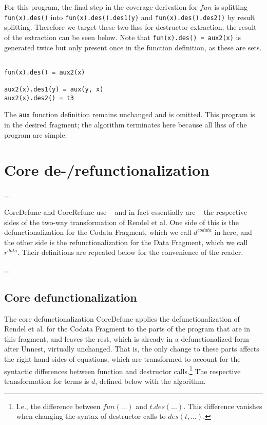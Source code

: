 For this program, the final step in the coverage derivation for $fun$ is splitting \texttt{fun(x).des()} into \texttt{fun(x).des().des1(y)} and \texttt{fun(x).des().des2()} by result splitting. Therefore we target these two lhss for destructor extraction; the result of the extraction can be seen below. Note that \texttt{fun(x).des() = aux2(x)} is generated twice but only present once in the function definition, as these are sets.

\begin{lstlisting}

fun(x).des() = aux2(x)

aux2(x).des1(y) = aux(y, x)
aux2(x).des2() = t3

\end{lstlisting}

The \texttt{aux} function definition remains unchanged and is omitted. This program is in the desired fragment; the algorithm terminates here because all lhss of the program are simple.

\section{Core de-/refunctionalization}

...

\textsf{CoreDefunc} and \textsf{CoreRefunc} use -- and in fact essentially are -- the respective sides of the two-way transformation of Rendel et al. One side of this is the defunctionalization for the Codata Fragment, which we call $d^{codata}$ in here, and the other side is the refunctionalization for the Data Fragment, which we call $r^{data}$. Their definitions are repeated below for the convenience of the reader.

...

\subsection{Core defunctionalization}

The core defunctionalization \textsf{CoreDefunc} applies the defunctionalization of Rendel et al. for the Codata Fragment to the parts of the program that are in this fragment, and leaves the rest, which is already in a defunctionalized form after \textsf{Unnest}, virtually unchanged. That is, the only change to these parts affects the right-hand sides of equations, which are transformed to account for the syntactic differences between function and destructor calls.\footnote{I.e., the difference between $fun(...)$ and $t.des(...)$. This difference vanishes when changing the syntax of destructor calls to $des(t, ...)$.} The respective transformation for terms is $d$, defined below with the algorithm.

